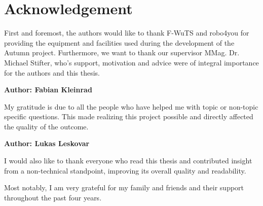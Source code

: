 \chapter{Acknowledgement}

First and foremost, the authors would like to thank F-WuTS and robo4you for providing the equipment and facilities used during the development of the Autumn project. Furthermore, we want to thank our supervisor MMag. Dr. Michael Stifter, who's support, motivation and advice were of integral importance for the authors and this thesis.\linebreak

\textbf{Author: Fabian Kleinrad}

My gratitude is due to all the people who have helped me with topic or non-topic specific questions. This made realizing this project possible and directly affected the quality of the outcome. 

\textbf{Author: Lukas Leskovar}


I would also like to thank everyone who read this thesis and contributed insight from a non-technical standpoint, improving its overall quality and readability. 

Most notably, I am very grateful for my family and friends and their support throughout the past four years. 
